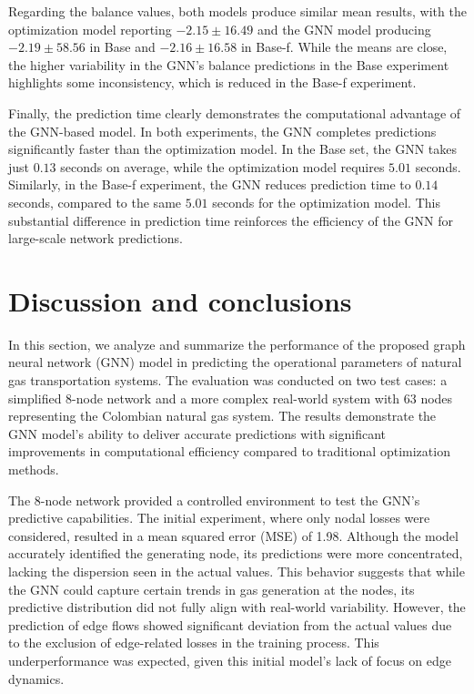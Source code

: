 Regarding the balance values, both models produce similar mean results, with the optimization model reporting $-2.15 \pm 16.49$ and the GNN model producing $-2.19 \pm 58.56$ in Base and $-2.16 \pm 16.58$ in Base-f. While the means are close, the higher variability in the GNN’s balance predictions in the Base experiment highlights some inconsistency, which is reduced in the Base-f experiment.

Finally, the prediction time clearly demonstrates the computational advantage of the GNN-based model. In both experiments, the GNN completes predictions significantly faster than the optimization model. In the Base set, the GNN takes just $0.13$ seconds on average, while the optimization model requires $5.01$ seconds. Similarly, in the Base-f experiment, the GNN reduces prediction time to $0.14$ seconds, compared to the same $5.01$ seconds for the optimization model. This substantial difference in prediction time reinforces the efficiency of the GNN for large-scale network predictions.


\section{Discussion and conclusions}

In this section, we analyze and summarize the performance of the proposed graph neural network (GNN) model in predicting the operational parameters of natural gas transportation systems. The evaluation was conducted on two test cases: a simplified 8-node network and a more complex real-world system with 63 nodes representing the Colombian natural gas system. The results demonstrate the GNN model's ability to deliver accurate predictions with significant improvements in computational efficiency compared to traditional optimization methods.


The 8-node network provided a controlled environment to test the GNN's predictive capabilities. The initial experiment, where only nodal losses were considered, resulted in a mean squared error (MSE) of 1.98. Although the model accurately identified the generating node, its predictions were more concentrated, lacking the dispersion seen in the actual values. This behavior suggests that while the GNN could capture certain trends in gas generation at the nodes, its predictive distribution did not fully align with real-world variability. However, the prediction of edge flows showed significant deviation from the actual values due to the exclusion of edge-related losses in the training process. This underperformance was expected, given this initial model's lack of focus on edge dynamics.


